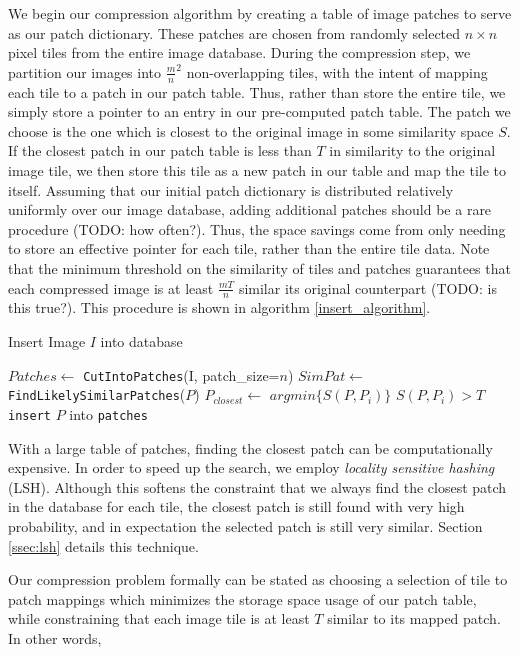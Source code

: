 We begin our compression algorithm by creating a table of image patches to serve as our patch dictionary.  These patches are chosen from randomly selected $n \times n$ pixel tiles from the entire image database.   During the compression step, we partition our images into $\frac{m}{n}^2$ non-overlapping tiles, with the intent of mapping each tile to a patch in our patch table.  Thus, rather  than store the entire tile, we simply store a pointer to an entry in our pre-computed patch table.  The patch we choose is the one which is closest to the original image in some similarity space $S$.  If the closest patch in our patch table is less than $T$ in similarity to the original image tile, we then store this tile as a new patch in our table and map the tile to itself.  Assuming that our initial patch dictionary is distributed relatively uniformly over our image database, adding additional patches should be a rare procedure (TODO: how often?).  Thus, the space savings come from only needing to store an effective pointer for each tile, rather than the entire tile data.  Note that the minimum threshold on the similarity of tiles and patches guarantees that each compressed image is at least $\frac{mT}{n}$ similar its original counterpart (TODO: is this true?).  This procedure is shown in algorithm \ref{insert_algorithm}.

\begin{algorithm}
    \caption{Insert Image $I$ into database}
    \label{alg:insert}
\begin{algorithmic}[1]
\State $Patches \leftarrow $ \texttt{CutIntoPatches}(I, patch\_size=$n$)
\State $SimPat \leftarrow $\texttt{FindLikelySimilarPatches}($P$)
\State $P_{closest} \leftarrow $ $argmin \{ S(P, P_i) \}$
\If $S(P, P_i) > T$
\State \texttt{insert} $P$ into \texttt{patches}
\EndIf
\EndFor
\vspace{3mm}
\end{algorithmic}
\label{insert_algorithm}
\end{algorithm}

With a large table of patches, finding the closest patch can be computationally expensive.  In order to speed up the search, we employ \emph{locality sensitive hashing} (LSH).  Although this softens the constraint that we always find the closest patch in the database for each tile, the closest patch is still found with very high probability, and in expectation the selected patch is still very similar.  Section \ref{ssec:lsh} details this technique.

Our compression problem formally can be stated as choosing a selection of tile to patch mappings which minimizes the storage space usage of our patch table, while constraining that each image tile is at least $T$ similar to its mapped patch.  In other words,

